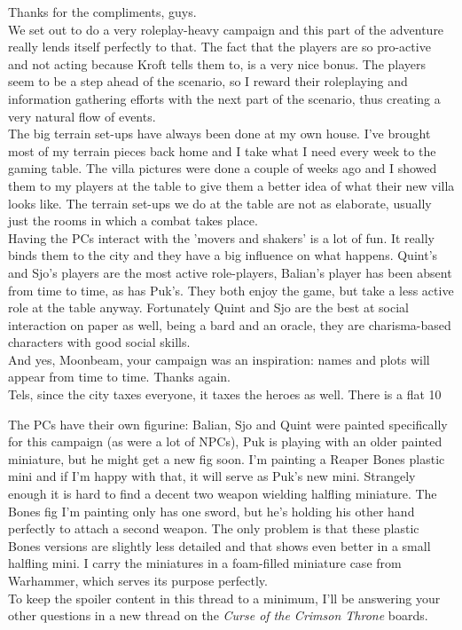 Thanks for the compliments, guys.\\

We set out to do a very roleplay-heavy campaign and this part of the adventure really lends itself perfectly to that. The fact that the players are so pro-active and not acting because Kroft tells them to, is a very nice bonus. The players seem to be a step ahead of the scenario, so I reward their roleplaying and information gathering efforts with the next part of the scenario, thus creating a very natural flow of events.\\

The big terrain set-ups have always been done at my own house. I've brought most of my terrain pieces back home and I take what I need every week to the gaming table. The villa pictures were done a couple of weeks ago and I showed them to my players at the table to give them a better idea of what their new villa looks like. The terrain set-ups we do at the table are not as elaborate, usually just the rooms in which a combat takes place.\\

Having the PCs interact with the 'movers and shakers' is a lot of fun. It really binds them to the city and they have a big influence on what happens. Quint's and Sjo's players are the most active role-players, Balian's player has been absent from time to time, as has Puk's. They both enjoy the game, but take a less active role at the table anyway. Fortunately Quint and Sjo are the best at social interaction on paper as well, being a bard and an oracle, they are charisma-based characters with good social skills.\\

And yes, Moonbeam, your campaign was an inspiration: names and plots will appear from time to time. Thanks again.\\

Tels, since the city taxes everyone, it taxes the heroes as well. There is a flat 10 %

The PCs have their own figurine: Balian, Sjo and Quint were painted specifically for this campaign (as were a lot of NPCs), Puk is playing with an older painted miniature, but he might get a new fig soon. I'm painting a Reaper Bones plastic mini and if I'm happy with that, it will serve as Puk's new mini. Strangely enough it is hard to find a decent two weapon wielding halfling miniature. The Bones fig I'm painting only has one sword, but he's holding his other hand perfectly to attach a second weapon. The only problem is that these plastic Bones versions are slightly less detailed and that shows even better in a small halfling mini. I carry the miniatures in a foam-filled miniature case from Warhammer, which serves its purpose perfectly.\\

To keep the spoiler content in this thread to a minimum, I'll be answering your other questions in a new thread on the {\itshape Curse of the Crimson Throne} boards. 